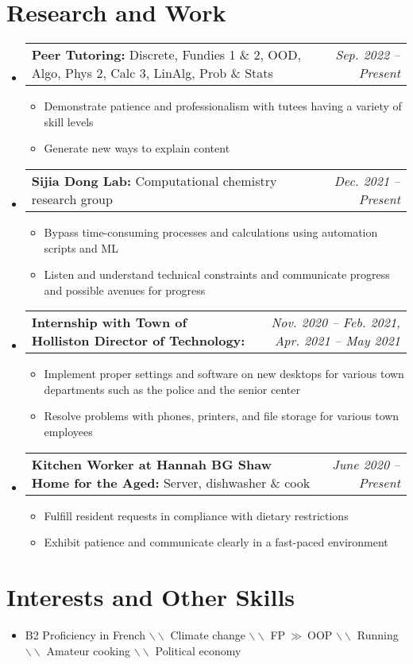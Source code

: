 \documentclass[letterpaper,11pt]{article}
\makeatletter
\newcommand{\resumeBullet}[1]{
  \item\small{
    #1 \vspace{-2pt}
  }
}
\newcommand{\resumeSubheadingThin}[3]{
  \vspace{-1pt}\item
    \begin{tabular*}{0.97\textwidth}[t]{l@{\extracolsep{\fill}}r}
      \small\textbf{#1:} #3 & \small\textit{#2} 
    \end{tabular*}\vspace{-5pt}
}
\newcommand{\summarysep}{ \textcolor{black!50}{$ \backslash \backslash $ }}
\newcommand{\resumeSubHeadingListStart}{\begin{itemize}[leftmargin=*]}
\newcommand{\resumeSubHeadingListEnd}{\end{itemize}}
\newcommand{\resumeItemListStart}{\begin{itemize}}
\newcommand{\resumeItemListEnd}{\end{itemize}\vspace{-5pt}}
\makeatother
\begin{document}
  \section{Research and Work}
  \resumeSubHeadingListStart
  \resumeSubheadingThin{Peer Tutoring}{Sep. 2022 -- Present}{Discrete, Fundies 1 \& 2, OOD, Algo, Phys 2, Calc 3, LinAlg, Prob \& Stats}
  \resumeItemListStart
    \resumeBullet{Demonstrate patience and professionalism with tutees having a variety of skill levels}
    \resumeBullet{Generate new ways to explain content}
  \resumeItemListEnd
  \resumeSubheadingThin{Sijia Dong Lab}{Dec. 2021 -- Present}{Computational chemistry research group}
  \resumeItemListStart
    \resumeBullet{Bypass time-consuming processes and calculations using automation scripts and ML}
    \resumeBullet{Listen and understand technical constraints and communicate progress and possible avenues for progress}
  \resumeItemListEnd
  \resumeSubheadingThin{Internship with Town of Holliston Director of Technology}{Nov. 2020 -- Feb. 2021, Apr. 2021 -- May 2021}{}
  \resumeItemListStart
    \resumeBullet{Implement proper settings and software on new desktops for various town departments such as the police and the senior center}
    \resumeBullet{Resolve problems with phones, printers, and file storage for various town employees}
  \resumeItemListEnd
  \resumeSubheadingThin{Kitchen Worker at Hannah BG Shaw Home for the Aged}{June 2020 -- Present}{Server, dishwasher \& cook} \resumeItemListStart
  \resumeBullet{Fulfill resident requests in compliance with dietary restrictions}
  \resumeBullet{Exhibit patience and communicate clearly in a fast-paced environment}
  \resumeItemListEnd \resumeSubHeadingListEnd

  \section{Interests and Other Skills} 
  \resumeSubHeadingListStart
    \item\small{B2 Proficiency in French \summarysep Climate change \summarysep
    FP$\ \gg\ $OOP \summarysep Running \summarysep Amateur cooking  \summarysep Political economy }
    \resumeSubHeadingListEnd


\end{document}
